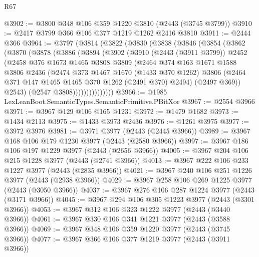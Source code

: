\begin{lexlean}{R67}
\begin{coremodule}
@3902 := @3800 @348 @106 @359 @1220 @3810 (@2443 (@3745 @3799))
@3910 := @2417 @3799 @366 @106 @377 @1219 @1262 @2416 @3810
@3911 := @2444 @366
@3964 := @3797
    (@3814
      (@3822
        (@3830
          (@3838
            (@3846
              (@3854
                (@3862
                  (@3870
                    (@3878
                      (@3886
                        (@3894
                          (@3902
                            (@3910
                              (@2443 (@3911 @3799))
                              @2452
                              (@2458
                                @376
                                @1673
                                @1465
                                @3808
                                @3809
                                (@2464
                                  @374
                                  @163
                                  @1671
                                  @1588
                                  @3806
                                  @2436
                                  (@2474
                                    @373
                                    @1467
                                    @1670
                                    (@1433 @370 @1262)
                                    @3806
                                    (@2464 @371 @147 @1465 @1465 @370 @1262 (@2491 @370) @2494)
                                    (@2497 @369))
                                  @2543)
                                (@2547 @3808)))))))))))))))
@3966 := @1985 LexLeanBoot.SemanticTypes.SemanticPrimitive.PBitXor
@3967 := @2554 @3966
@3971 := @3967 @129 @106 @165 @1231
@3972 := @1479 @1682
@3973 := @1434 @2113
@3975 := @1433 @3973 @2436
@3976 := @1261 @3975
@3977 := @3972 @3976
@3981 := @3971 @3977 (@2443 (@2445 @3966))
@3989 := @3967 @168 @106 @179 @1230 @3977 (@2443 (@2580 @3966))
@3997 := @3967 @186 @106 @197 @1229 @3977 (@2443 (@2656 @3966))
@4005 := @3967 @204 @106 @215 @1228 @3977 (@2443 (@2741 @3966))
@4013 := @3967 @222 @106 @233 @1227 @3977 (@2443 (@2835 @3966))
@4021 := @3967 @240 @106 @251 @1226 @3977 (@2443 (@2938 @3966))
@4029 := @3967 @258 @106 @269 @1225 @3977 (@2443 (@3050 @3966))
@4037 := @3967 @276 @106 @287 @1224 @3977 (@2443 (@3171 @3966))
@4045 := @3967 @294 @106 @305 @1223 @3977 (@2443 (@3301 @3966))
@4053 := @3967 @312 @106 @323 @1222 @3977 (@2443 (@3440 @3966))
@4061 := @3967 @330 @106 @341 @1221 @3977 (@2443 (@3588 @3966))
@4069 := @3967 @348 @106 @359 @1220 @3977 (@2443 (@3745 @3966))
@4077 := @3967 @366 @106 @377 @1219 @3977 (@2443 (@3911 @3966))

\end{coremodule}
\end{lexlean}
